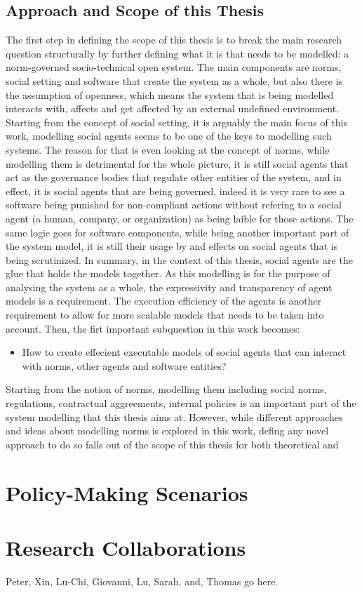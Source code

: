 \subsection{Approach and Scope of this Thesis}
The first step in defining the scope of this thesis is to break the main research question structurally by further defining what it is that needs to be modelled: a norm-governed socio-technical open system. The main components are norms, social setting and software that create the system as a whole, but also there is the assumption of openness, which means the system that is being modelled interacts with, affects and get affected by an external undefined environment. Starting from the concept of social setting, it is arguably the main focus of this work, modelling social agents seems to be one of the keys to modelling such systems. The reason for that is even looking at the concept of norms, while modelling them is detrimental for the whole picture, it is still social agents that act as the governance bodies that regulate other entities of the system, and in effect, it is social agents that are being governed, indeed it is very rare to see a software being punished for non-compliant actions without refering to a social agent (a human, company, or organization) as being laible for those actions. The same logic goes for software components, while being another important part of the system model, it is still their usage by and effects on social agents that is being scrutinized. In summary, in the context of this thesis, social agents are the glue that holds the models together. As this modelling is for the purpose of analysing the system as a whole, the expressivity and transparency of agent models is a requirement. The execution efficiency of the agents is another requirement to allow for more scalable models that needs to be taken into account. Then, the firt important subquestion in this work becomes:

\begin{itemize}
    \item How to create effecient executable models of social agents that can interact with norms, other agents and software entities?
\end{itemize}





Starting from the notion of norms, modelling them including social norms, regulations, contractual aggreements, internal policies is an important part of the system modelling that this thesis aims at. However, while different approaches and ideas about modelling norms is explored in this work, defing any novel approach to do so falls out of the scope of this thesis for both theoretical and 




\section{Policy-Making Scenarios}


\section{Research Collaborations}
Peter, Xin, Lu-Chi, Giovanni, Lu, Sarah, and, Thomas go here.